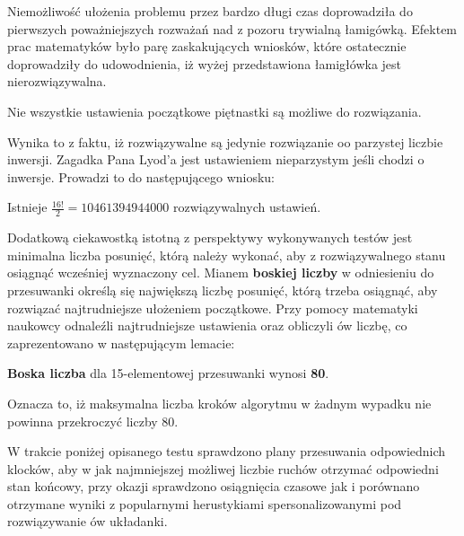         Niemożliwość ułożenia problemu przez bardzo długi czas doprowadziła do pierwszych poważniejszych rozważań 
        nad z pozoru trywialną łamigówką. Efektem prac matematyków było parę zaskakujących wniosków, które ostatecznie doprowadziły 
        do udowodnienia, iż wyżej przedstawiona łamigłówka jest nierozwiązywalna.
        \begin{lemma}
            Nie wszystkie ustawienia początkowe piętnastki są możliwe do rozwiązania.\cite{Fifteen}
        \end{lemma}
        Wynika to z faktu, iż rozwiązywalne są jedynie rozwiązanie oo parzystej liczbie inwersji. Zagadka Pana Lyod'a jest 
        ustawieniem nieparzystym jeśli chodzi o inwersje. Prowadzi to do następującego wniosku:
        \begin{corollary}
            Istnieje $\frac{16!}{2}=10 461 394 944 000$ rozwiązywalnych ustawień. 
        \end{corollary}
        Dodatkową ciekawostką istotną z perspektywy wykonywanych testów jest minimalna liczba posunięć, którą należy wykonać, 
        aby z rozwiązywalnego stanu osiągnąć wcześniej wyznaczony cel. Mianem \textbf{boskiej liczby} w odniesieniu do przesuwanki
        określą się największą liczbę posunięć, którą trzeba osiągnąć, aby rozwiązać najtrudniejsze ułożeniem początkowe. Przy pomocy matematyki 
        naukowcy odnaleźli najtrudniejsze ustawienia oraz obliczyli ów liczbę, co zaprezentowano w następującym lemacie:
        \begin{lemma}
            \textbf{Boska liczba} dla 15-elementowej przesuwanki wynosi \textbf{80}. \cite{80Moves}
        \end{lemma}
        Oznacza to, iż maksymalna liczba kroków algorytmu w żadnym wypadku nie powinna przekroczyć liczby 80.

        W trakcie poniżej opisanego testu sprawdzono plany przesuwania odpowiednich klocków, aby w jak najmniejszej możliwej liczbie ruchów
        otrzymać odpowiedni stan końcowy, przy okazji sprawdzono osiągnięcia czasowe jak i porównano otrzymane wyniki z popularnymi herustykiami 
        spersonalizowanymi pod rozwiązywanie ów układanki.

